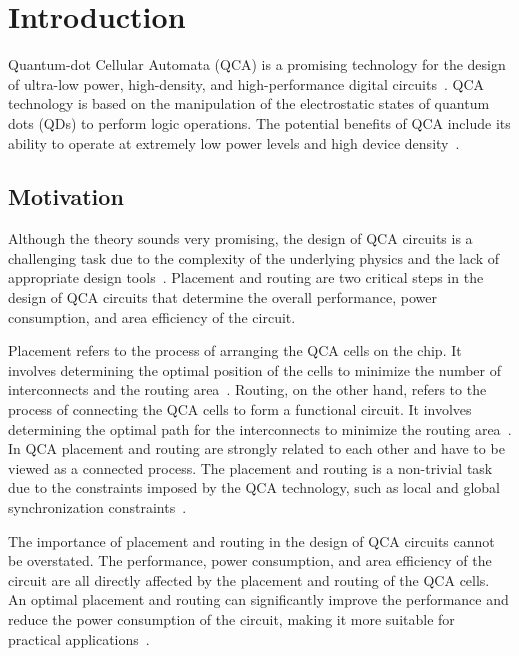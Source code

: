
\chapter{Introduction}\label{chapter:introduction}
Quantum-dot Cellular Automata (QCA) is a promising technology for the design of ultra-low power, high-density, and high-performance digital circuits~\cite{perri2012new}. QCA technology is based on the manipulation of the electrostatic states of quantum dots (QDs) to perform logic operations. The potential benefits of QCA include its ability to operate at extremely low power levels and high device density~\cite{sen2015towards}.

\section{Motivation}
Although the theory sounds very promising, the design of QCA circuits is a challenging task due to the complexity of the underlying physics and the lack of appropriate design tools~\cite{safoev2020design}. Placement and routing are two critical steps in the design of QCA circuits that determine the overall performance, power consumption, and area efficiency of the circuit.

Placement refers to the process of arranging the QCA cells on the chip. It involves determining the optimal position of the cells to minimize the number of interconnects and the routing area~\cite{kahng2011vlsi}. Routing, on the other hand, refers to the process of connecting the QCA cells to form a functional circuit. It involves determining the optimal path for the interconnects to minimize the routing area~\cite{kahng2011vlsi}. In QCA placement and routing are strongly related to each other and have to be viewed as a connected process. The placement and routing is a non-trivial task due to the constraints imposed by the QCA technology, such as local and global synchronization constraints~\cite{ortho}.

The importance of placement and routing in the design of QCA circuits cannot be overstated. The performance, power consumption, and area efficiency of the circuit are all directly affected by the placement and routing of the QCA cells. An optimal placement and routing can significantly improve the performance and reduce the power consumption of the circuit, making it more suitable for practical applications~\cite{walter2018exact}.

